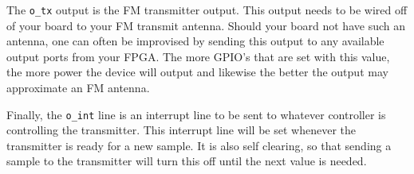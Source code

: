 \documentclass{gqtekspec}
\begin{document}
The {\tt o\_tx} output is the FM transmitter output.  This output needs to be
wired off of your board to your FM transmit antenna.  Should your board not have
such an antenna, one can often be improvised by sending this output to any
available output ports from your FPGA.  The more GPIO's that are set with this
value, the more power the device will output and likewise the better the output
may approximate an FM antenna.

Finally, the {\tt o\_int} line is an interrupt line to be sent to whatever
controller is controlling the transmitter.  This interrupt line will be set
whenever the transmitter is ready for a new sample.  It is also self clearing, 
so that sending a sample to the transmitter will turn this off until the next
value is needed.

\end{document}
